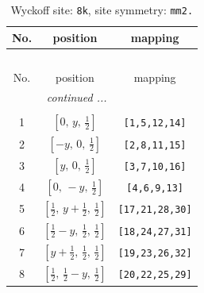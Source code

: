 \documentclass[fleqn,8pt]{jsarticle}
\begin{document}
\begin{longtable}{ccc}
\caption{Wyckoff site: {\tt 8k}, site symmetry: {\tt mm2.}}
 \\
 \hline \hline
No. & position & mapping \\ \hline \endfirsthead

\multicolumn{2}{l}{\tablename\ \thetable{}} \\
 \hline \hline
No. & position & mapping \\ \hline \endhead

 \hline \hline
\multicolumn{2}{r}{\footnotesize\it continued ...} \\ \endfoot

 \hline \hline
\multicolumn{2}{r}{} \\ \endlastfoot

1 & $\left[ 0,\, y,\, \frac{1}{2} \right]$ & {\tt [1,5,12,14]} \\ \hline
2 & $\left[ - y,\, 0,\, \frac{1}{2} \right]$ & {\tt [2,8,11,15]} \\ \hline
3 & $\left[ y,\, 0,\, \frac{1}{2} \right]$ & {\tt [3,7,10,16]} \\ \hline
4 & $\left[ 0,\, - y,\, \frac{1}{2} \right]$ & {\tt [4,6,9,13]} \\ \hline
5 & $\left[ \frac{1}{2},\, y + \frac{1}{2},\, \frac{1}{2} \right]$ & {\tt [17,21,28,30]} \\ \hline
6 & $\left[ \frac{1}{2} - y,\, \frac{1}{2},\, \frac{1}{2} \right]$ & {\tt [18,24,27,31]} \\ \hline
7 & $\left[ y + \frac{1}{2},\, \frac{1}{2},\, \frac{1}{2} \right]$ & {\tt [19,23,26,32]} \\ \hline
8 & $\left[ \frac{1}{2},\, \frac{1}{2} - y,\, \frac{1}{2} \right]$ & {\tt [20,22,25,29]} \\
\end{longtable}
\renewcommand{\arraystretch}{1.2}
\end{document}
